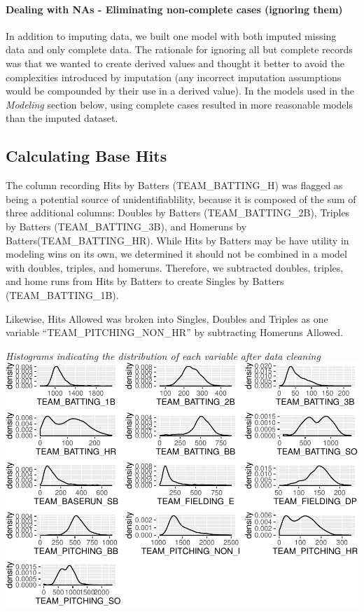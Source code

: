 \documentclass[]{article}
\let\oldparagraph\paragraph
\renewcommand{\paragraph}[1]{\oldparagraph{#1}\mbox{}}
\begin{document}
\paragraph{Dealing with NAs - Eliminating non-complete cases (ignoring
them)}\label{dealing-with-nas---eliminating-non-complete-cases-ignoring-them}

In addition to imputing data, we built one model with both imputed
missing data and only complete data. The rationale for ignoring all but
complete records was that we wanted to create derived values and thought
it better to avoid the complexities introduced by imputation (any
incorrect imputation assumptions would be compounded by their use in a
derived value). In the models used in the \emph{Modeling} section below,
using complete cases resulted in more reasonable models than the imputed
dataset.

\subsection{Calculating Base Hits}\label{calculating-base-hits}

The column recording Hits by Batters (TEAM\_BATTING\_H) was flagged as
being a potential source of unidentifiablility, because it is composed
of the sum of three additional columns: Doubles by Batters
(TEAM\_BATTING\_2B), Triples by Batters (TEAM\_BATTING\_3B), and
Homeruns by Batters(TEAM\_BATTING\_HR). While Hits by Batters may be
have utility in modeling wins on its own, we determined it should not be
combined in a model with doubles, triples, and homeruns. Therefore, we
subtracted doubles, triples, and home runs from Hits by Batters to
create Singles by Batters (TEAM\_BATTING\_1B).

Likewise, Hits Allowed was broken into Singles, Doubles and Triples as
one variable ``TEAM\_PITCHING\_NON\_HR'' by subtracting Homeruns
Allowed.

\emph{Histograms indicating the distribution of each variable after data
cleaning}\\
\includegraphics{DATA621-Homework-1_files/figure-latex/unnamed-chunk-17-1.pdf}
\end{document}
